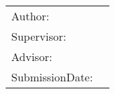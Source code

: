 \begin{titlepage}
  \centering


  \vspace{5mm}
  \begin{spacing}{1.5}
    {\huge\MakeUppercase{\getFaculty{}}}\\
  \end{spacing}

  \vspace{5mm}
  {\large\MakeUppercase{\getUniversity{}}}\\

  \vspace{20mm}
  {\Large \getDoctype{}}

  \makeatletter
  \vspace{15mm}
  {
  {\huge\bfseries \getTitle{}}
  }
  \makeatother

  \vspace{15mm}
  \begin{tabular}{l l}
    Author:         & \getAuthor{} \\
    Supervisor:     & \getSupervisor{} \\
    Advisor:        & \getAdvisor{} \\
    SubmissionDate: & \getSubmissionDate{} \\
  \end{tabular}

\end{titlepage}
